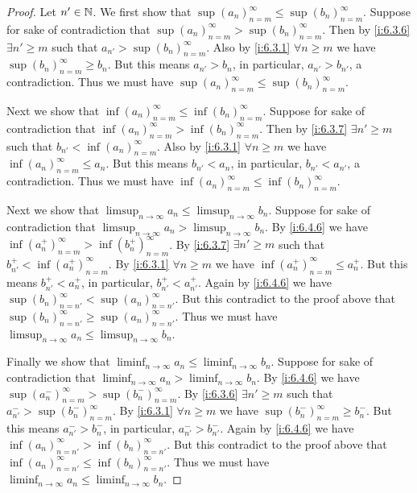 \begin{proof}
  Let \(n' \in \mathbb{N}\).
  We first show that \(\sup(a_n)_{n = m}^\infty \leq \sup(b_n)_{n = m}^\infty\).
  Suppose for sake of contradiction that \(\sup(a_n)_{n = m}^\infty > \sup(b_n)_{n = m}^\infty\).
  Then by \cref{i:6.3.6} \(\exists n' \geq m\) such that \(a_{n'} > \sup(b_n)_{n = m}^\infty\).
  Also by \cref{i:6.3.1} \(\forall n \geq m\) we have \(\sup(b_n)_{n = m}^\infty \geq b_n\).
  But this means \(a_{n'} > b_n\), in particular, \(a_{n'} > b_{n'}\), a contradiction.
  Thus we must have \(\sup(a_n)_{n = m}^\infty \leq \sup(b_n)_{n = m}^\infty\).

  Next we show that \(\inf(a_n)_{n = m}^\infty \leq \inf(b_n)_{n = m}^\infty\).
  Suppose for sake of contradiction that \(\inf(a_n)_{n = m}^\infty > \inf(b_n)_{n = m}^\infty\).
  Then by \cref{i:6.3.7} \(\exists n' \geq m\) such that \(b_{n'} < \inf(a_n)_{n = m}^\infty\).
  Also by \cref{i:6.3.1} \(\forall n \geq m\) we have \(\inf(a_n)_{n = m}^\infty \leq a_n\).
  But this means \(b_{n'} < a_n\), in particular, \(b_{n'} < a_{n'}\), a contradiction.
  Thus we must have \(\inf(a_n)_{n = m}^\infty \leq \inf(b_n)_{n = m}^\infty\).

  Next we show that \(\limsup_{n \to \infty} a_n \leq \limsup_{n \to \infty} b_n\).
  Suppose for sake of contradiction that \(\limsup_{n \to \infty} a_n > \limsup_{n \to \infty} b_n\).
  By \cref{i:6.4.6} we have \(\inf(a_n^+)_{n = m}^\infty > \inf(b_n^+)_{n = m}^\infty\).
  By \cref{i:6.3.7} \(\exists n' \geq m\) such that \(b_{n'}^+ < \inf(a_n^+)_{n = m}^\infty\).
  By \cref{i:6.3.1} \(\forall n \geq m\) we have \(\inf(a_n^+)_{n = m}^\infty \leq a_n^+\).
  But this means \(b_{n'}^+ < a_n^+\), in particular, \(b_{n'}^+ < a_{n'}^+\).
  Again by \cref{i:6.4.6} we have \(\sup(b_n)_{n = n'}^\infty < \sup(a_n)_{n = n'}^\infty\).
  But this contradict to the proof above that \(\sup(b_n)_{n = n'}^\infty \geq \sup(a_n)_{n = n'}^\infty\).
  Thus we must have \(\limsup_{n \to \infty} a_n \leq \limsup_{n \to \infty} b_n\).

  Finally we show that \(\liminf_{n \to \infty} a_n \leq \liminf_{n \to \infty} b_n\).
  Suppose for sake of contradiction that \(\liminf_{n \to \infty} a_n > \liminf_{n \to \infty} b_n\).
  By \cref{i:6.4.6} we have \(\sup(a_n^-)_{n = m}^\infty > \sup(b_n^-)_{n = m}^\infty\).
  By \cref{i:6.3.6} \(\exists n' \geq m\) such that \(a_{n'}^- > \sup(b_n^-)_{n = m}^\infty\).
  By \cref{i:6.3.1} \(\forall n \geq m\) we have \(\sup(b_n^-)_{n = m}^\infty \geq b_n^-\).
  But this means \(a_{n'}^- > b_n^-\), in particular, \(a_{n'}^- > b_{n'}^-\).
  Again by \cref{i:6.4.6} we have \(\inf(a_n)_{n = n'}^\infty > \inf(b_n)_{n = n'}^\infty\).
  But this contradict to the proof above that \(\inf(a_n)_{n = n'}^\infty \leq \inf(b_n)_{n = n'}^\infty\).
  Thus we must have \(\liminf_{n \to \infty} a_n \leq \liminf_{n \to \infty} b_n\).
\end{proof}

